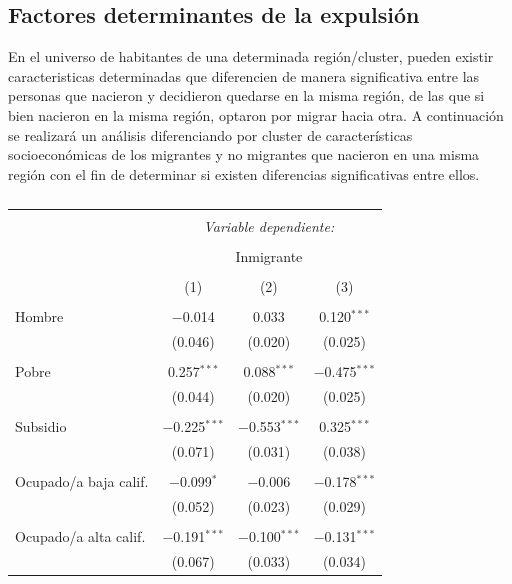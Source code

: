 \documentclass[12pt,a4paper]{article}
\begin{document}
\subsection{Factores determinantes de la expulsión}

En el universo de habitantes de una determinada región/cluster, pueden existir caracteristicas determinadas que diferencien de manera significativa entre las personas que nacieron  y decidieron quedarse en la misma región, de las que si bien nacieron en la misma región, optaron por migrar hacia otra. A continuación se realizará un análisis diferenciando por cluster  de características socioeconómicas de los migrantes y no migrantes  que nacieron en una misma región con el fin de determinar si existen diferencias significativas entre ellos. 
\newpage
\begin{table}[!htbp] \centering 
  \caption{} 
  \label{cuadro:reg_expulsion} 
\scriptsize 
\begin{tabular}{@{\extracolsep{5pt}}lccc} 
\\[-1.8ex]\hline 
\hline \\[-1.8ex] 
 & \multicolumn{3}{c}{\textit{Variable dependiente:}} \\ 
\cline{2-4} 
\\[-1.8ex] & \multicolumn{3}{c}{Inmigrante} \\ 
\\[-1.8ex] & (1) & (2) & (3)\\ 
\hline \\[-1.8ex] 
 Hombre & $-$0.014 & 0.033 & 0.120$^{***}$ \\ 
  & (0.046) & (0.020) & (0.025) \\ 
  & & & \\ 
 Pobre & 0.257$^{***}$ & 0.088$^{***}$ & $-$0.475$^{***}$ \\ 
  & (0.044) & (0.020) & (0.025) \\ 
  & & & \\ 
 Subsidio & $-$0.225$^{***}$ & $-$0.553$^{***}$ & 0.325$^{***}$ \\ 
  & (0.071) & (0.031) & (0.038) \\ 
  & & & \\ 
 Ocupado/a baja calif. & $-$0.099$^{*}$ & $-$0.006 & $-$0.178$^{***}$ \\ 
  & (0.052) & (0.023) & (0.029) \\ 
  & & & \\ 
 Ocupado/a alta calif. & $-$0.191$^{***}$ & $-$0.100$^{***}$ & $-$0.131$^{***}$ \\ 
  & (0.067) & (0.033) & (0.034) \\ 

\end{tabular}
\end{table}
\end{document}
